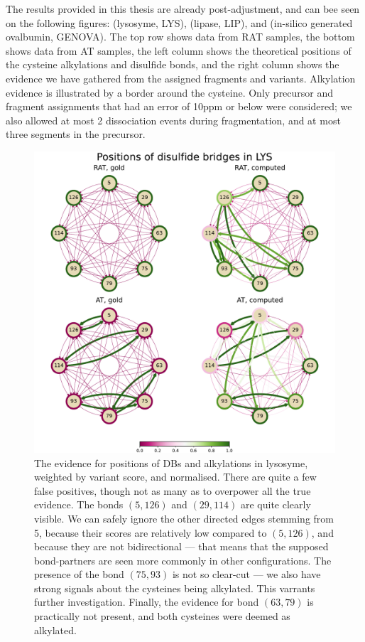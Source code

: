 The results provided in this thesis are already post-adjustment, and can bee seen on the following figures:  (lysosyme, LYS),  (lipase, LIP), and  (in-silico generated ovalbumin, GENOVA). The top row shows data from RAT samples, the bottom shows data from AT samples, the left column shows the theoretical positions of the cysteine alkylations and disulfide bonds, and the right column shows the evidence we have gathered from the assigned fragments and variants. Alkylation evidence is illustrated by a border around the cysteine. Only precursor and fragment assignments that had an error of 10ppm or below were considered; we also allowed at most 2 dissociation events during fragmentation, and at most three segments in the precursor.


\begin{figure}
  \centering
  \includegraphics[width=1\linewidth]{img/lys.pdf}
  \caption{The evidence for positions of DBs and alkylations in lysosyme, weighted by variant score, and normalised. There are quite a few false positives, though not as many as to overpower all the true evidence. The bonds \((5, 126)\) and \((29, 114)\) are quite clearly visible. We can safely ignore the other directed edges stemming from 5, because their scores are relatively low compared to \((5, 126)\), and because they are not bidirectional --- that means that the supposed bond-partners are seen more commonly in other configurations. The presence of the bond \((75, 93)\) is not so clear-cut --- we also have strong signals about the cysteines being alkylated. This varrants further investigation. Finally, the evidence for bond \((63, 79)\) is practically not present, and both cysteines were deemed as alkylated.}\label{fig:lys}
\end{figure}

